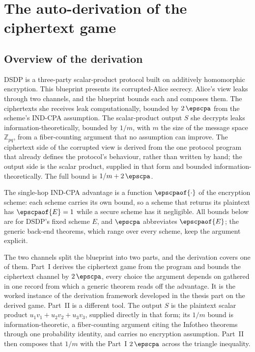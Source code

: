 
\part{The auto-derivation of the ciphertext game}
\label{part:autoderiv}

\chapter{Overview of the derivation}

DSDP is a three-party scalar-product protocol built on additively homomorphic
encryption. This blueprint presents its corrupted-Alice secrecy. Alice's view
leaks through two channels, and the blueprint bounds each and composes them. The
ciphertexts she receives leak computationally, bounded by $2\,\epscpa$ from the
scheme's IND-CPA assumption. The scalar-product output $S$ she decrypts leaks
information-theoretically, bounded by $1/m$, with $m$ the size of the message
space $\mathbb{Z}_{pq}$, from a fiber-counting argument that no assumption can
improve. The ciphertext side of the corrupted view is derived
from the one protocol program that already defines the protocol's behaviour,
rather than written by hand; the output side is the scalar product, supplied in
that form and bounded information-theoretically. The full bound is
$1/m + 2\,\epscpa$.

The single-hop IND-CPA advantage is a function $\epscpaof{\cdot}$ of the
encryption scheme: each scheme carries its own bound, so a scheme that returns
its plaintext has $\epscpaof{E}=1$ while a secure scheme has it negligible. All
bounds below are for DSDP's fixed scheme $E$, and $\epscpa$ abbreviates
$\epscpaof{E}$; the generic back-end theorems, which range over every scheme,
keep the argument explicit.

The two channels split the blueprint into two parts, and the derivation covers
one of them. Part~I derives the ciphertext game from the program and bounds the
ciphertext channel by $2\,\epscpa$, every choice the argument depends on gathered
in one record from which a generic theorem reads off the advantage. It is the
worked instance of the derivation framework developed in the thesis part on the
derived game. Part~II is a different tool. The output $S$ is the plaintext scalar
product $u_1v_1+u_2v_2+u_3v_3$, supplied directly in that form; its $1/m$ bound is
information-theoretic, a fiber-counting argument citing the Infotheo theorems
through one probability identity, and carries no encryption assumption. Part~II
then composes that $1/m$ with the Part~I $2\,\epscpa$ across the triangle
inequality.

